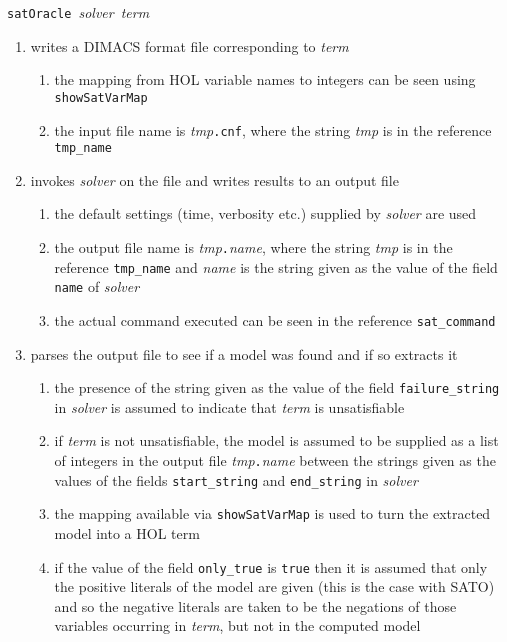 \documentclass[12pt]{article}
\renewcommand{\t}[1]{\mbox{\small\tt #1}}
\newcommand\HOL{HOL\xspace}
\begin{document}
{\small{\tt satOracle}~{\it solver}~{\it term}}


\begin{enumerate}
\item writes a DIMACS format file corresponding to {\it term}
\begin{enumerate}
\item the mapping from \HOL variable names to integers can be seen using
\t{showSatVarMap}
\item the input file name is {\it tmp}{\tt{.cnf}}, where
the string {\it tmp} is in the reference \t{tmp\_name}
\end{enumerate}


\item invokes {\it solver} on the file and writes results to an output file


\begin{enumerate}
\item the default settings (time, verbosity etc.) supplied by {\it solver}
are used
\item the output file name is {\it tmp}{\tt{.}}{\it{name}}, where
the string {\it tmp} is in the reference \t{tmp\_name}
and {\it name} is the string given as the value of the field {\tt name} of {\it solver}
\item the actual command executed can be seen in the reference 
\t{sat\_command}
\end{enumerate}


\item parses the output file to see if a model was found and if so extracts it


\begin{enumerate}
\item the presence of the string given as the value of the
field {\tt failure\_string} in {\it solver} is
assumed to indicate that {\it term} is unsatisfiable
\item if {\it term} is not unsatisfiable,
the model is assumed to be supplied as a list of integers in the output file 
{\it tmp}{\tt{.}}{\it{name}} between the strings
given as the values of the fields {\tt start\_string} and {\tt end\_string}
in {\it solver}
\item the mapping available via \t{showSatVarMap} is used
to turn the extracted model into a \HOL term
\item if the value of the field {\tt only\_true} is
\t{true} then it is assumed that only the positive literals
of the model are given (this is the case with SATO) and so
the negative literals are taken to be the negations of those variables
occurring in {\it term}, but not in the computed model
\end{enumerate}



\end{enumerate}
\end{document}
